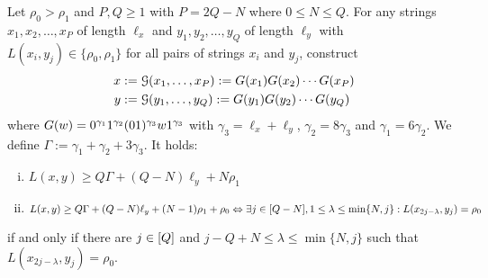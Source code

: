 \begin{lemma}
Let $\rho_0 > \rho_1$ and $P, Q \geq 1$ with $P = 2Q - N$ where $0 \leq N \leq Q$.
For any strings $x_1, x_2, \ldots, x_P$ of length $\ell_x$ and $y_1, y_2, \ldots, y_Q$ of length $\ell_y$ with $L(x_i, y_j) \in \{\rho_0, \rho_1\}$ for all pairs of strings $x_i$ and $y_j$, construct
\begin{align*}
	x &:= \mathcal{G}(x_1, \ldots, x_P) := G(x_1)G(x_2) \cdots G(x_P)\\
	y &:= \mathcal{G}(y_1, \ldots, y_Q) := G(y_1)G(y_2) \cdots G(y_Q)
\end{align*}
where $G(w) = 0^{\gamma_1}1^{\gamma_2}(01)^{\gamma_3}w1^{\gamma_3}$ with $\gamma_3 = \ell_x + \ell_y$, $\gamma_2 = 8\gamma_3$ and $\gamma_1 = 6\gamma_2$.
We define $\Gamma := \gamma_1 + \gamma_2 + 3\gamma_3$.
It holds:
%
\begin{enumerate}[(i)]
\item\label{lem:1-2vs1gadget-1} $L(x,y) \geq Q\Gamma + (Q-N)\ell_y + N\rho_1$
\item\label{lem:1-2vs1gadget-2} $L(x,y) \geq Q\Gamma + (Q-N)\ell_y + (N-1)\rho_1 + \rho_0 \Leftrightarrow \exists j \in [Q - N],1 \leq \lambda \leq \min\{N, j\}: L(x_{2j-\lambda}, y_j) = \rho_0$
\end{enumerate}
%
if and only if there are $j \in [Q]$ and $j - Q + N \leq \lambda \leq \min\{N, j\}$ such that $L(x_{2j-\lambda}, y_j) = \rho_0$.

\end{lemma}

